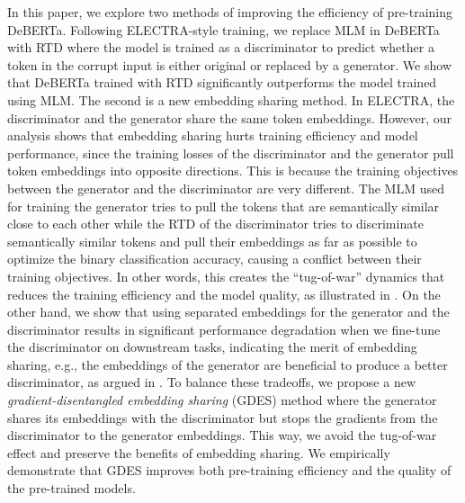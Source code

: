 In this paper, we explore two methods of improving the efficiency of pre-training DeBERTa. Following ELECTRA-style training, we replace MLM in DeBERTa with RTD where the model is trained as a discriminator to predict whether a token in the corrupt input is either original or replaced by a generator. We show that DeBERTa trained with RTD significantly outperforms the model trained using MLM. The second is a new embedding sharing method. In ELECTRA, the discriminator and the generator share the same token embeddings. However, our analysis shows that embedding sharing hurts training efficiency and model performance, since the training losses of the discriminator and the generator pull token embeddings into opposite directions. This is because the training objectives between the generator and the discriminator are very different. The MLM used for training the generator tries to pull the tokens that are semantically similar close to each other while the RTD of the discriminator tries to discriminate semantically similar tokens and pull their embeddings as far as possible to optimize the binary classification accuracy, causing a conflict between their training objectives. In other words, this creates the ``tug-of-war'' dynamics that reduces the training efficiency and the model quality, as illustrated in \cite{hadsell2020embracing}. On the other hand, we show that using separated embeddings for the generator and the discriminator results in significant performance degradation when we fine-tune the discriminator on downstream tasks, indicating the merit of embedding sharing, e.g., the embeddings of the generator are beneficial to produce a better discriminator, as argued in  \cite{clark2020electra}. To balance these tradeoffs, we propose a new \emph{gradient-disentangled embedding sharing} (GDES) method where the generator shares its embeddings with the discriminator but stops the gradients from the discriminator to the generator embeddings.  This way, we avoid the tug-of-war effect and preserve the benefits of embedding sharing. We empirically demonstrate that GDES improves both pre-training efficiency and the quality of the pre-trained models.

